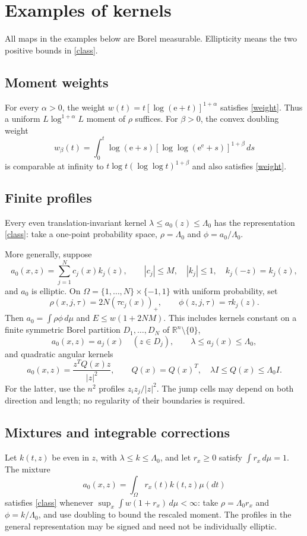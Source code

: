\documentclass{article}
\newcommand{\R}{\mathbb R}
\newcommand{\dd}{\,d}
\begin{document}
\section{Examples of kernels}

All maps in the examples below are Borel measurable. Ellipticity means the two positive bounds in \eqref{class}.

\subsection*{Moment weights}
For every $\alpha>0$, the weight $w(t)=t[\log(\mathrm e+t)]^{1+\alpha}$ satisfies \eqref{weight}. Thus a uniform $L\log^{1+\alpha}L$ moment of $\rho$ suffices. For $\beta>0$, the convex doubling weight
\[
 w_\beta(t)=\int_0^t\log(\mathrm e+s)
             [\log\log(\mathrm e^{\mathrm e}+s)]^{1+\beta}\dd s
\]
is comparable at infinity to $t\log t(\log\log t)^{1+\beta}$ and also satisfies \eqref{weight}.

\subsection*{Finite profiles}
Every even translation-invariant kernel $\lambda\le a_0(z)\le\Lambda_0$ has the representation \eqref{class}: take a one-point probability space, $\rho=\Lambda_0$ and $\phi=a_0/\Lambda_0$.

More generally, suppose
\[
 a_0(x,z)=\sum_{j=1}^N c_j(x)k_j(z),\qquad
 |c_j|\le M,\quad |k_j|\le1,\quad k_j(-z)=k_j(z),
\]
and $a_0$ is elliptic. On $\Omega=\{1,\ldots,N\}\times\{-1,1\}$ with uniform probability, set
\[
 \rho(x,j,\tau)=2N(\tau c_j(x))_+,
 \qquad\phi(z,j,\tau)=\tau k_j(z).
\]
Then $a_0=\int\rho\phi\dd\mu$ and $E\le w(1+2NM)$. This includes kernels constant on a finite symmetric Borel partition $D_1,\ldots,D_N$ of $\R^n\setminus\{0\}$,
\[
 a_0(x,z)=a_j(x)\quad(z\in D_j),\qquad
 \lambda\le a_j(x)\le\Lambda_0,
\]
and quadratic angular kernels
\[
 a_0(x,z)=\frac{z^TQ(x)z}{|z|^2},\qquad
 Q(x)=Q(x)^T,\quad\lambda I\le Q(x)\le\Lambda_0 I.
\]
For the latter, use the $n^2$ profiles $z_i z_j/|z|^2$. The jump cells may depend on both direction and length; no regularity of their boundaries is required.

\subsection*{Mixtures and integrable corrections}
Let $k(t,z)$ be even in $z$, with $\lambda\le k\le\Lambda_0$, and let $r_x\ge0$ satisfy $\int r_x\dd\mu=1$. The mixture
\[
 a_0(x,z)=\int_\Omega r_x(t)k(t,z)\mu(dt)
\]
satisfies \eqref{class} whenever $\sup_x\int w(1+r_x)\dd\mu<\infty$: take $\rho=\Lambda_0r_x$ and $\phi=k/\Lambda_0$, and use doubling to bound the rescaled moment. The profiles in the general representation may be signed and need not be individually elliptic.
\end{document}
